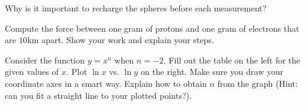 \documentclass[addpoints]{physlabs}
\date{\today}
\begin{document}
\maketitle

\begin{prelab}

    \question[1] Why is it important to recharge the spheres before each measurement?
    \begin{solution}[1cm]
    \end{solution}

    \question[2] Compute the force between one gram of protons and one gram of electrons that are $10$km apart.
    Show your work and explain your steps.
    \begin{solution}[2.5cm]
    \end{solution}

    \question[3] Consider the function $y=x^n$ when $n=-2$.
    Fill out the table on the left for the given values of $x$.
    Plot $\ln x$ vs. $\ln y$ on the right.
    Make sure you draw your coordinate axes in a smart way.
    Explain how to obtain $n$ from the graph (Hint: can you fit a straight line to your plotted points?).\\
    \vspace{5pt}\\

\end{prelab}
\end{document}
